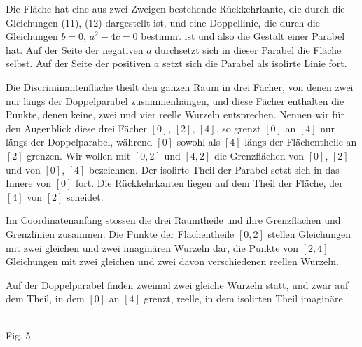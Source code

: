 \documentclass[11pt]{article}
\begin{document}
Die Fl\"ache hat eine aus zwei Zweigen bestehende R\"uckkehrkante, die durch die Gleichungen (11), (12) dargestellt ist, und eine Doppellinie, die durch die Gleichungen $b=0$, $a^2-4c=0$ bestimmt ist und also die Gestalt einer Parabel hat. Auf der Seite der negativen $a$ durchsetzt sich in dieser Parabel die Fl\"ache selbst. Auf der Seite der positiven $a$ setzt sich die Parabel als isolirte Linie fort.

Die Discriminantenfl\"ache theilt den ganzen Raum in drei F\"acher, von denen zwei nur l\"angs der Doppelparabel zusammenh\"angen, und diese F\"acher enthalten die Punkte, denen keine, zwei und vier reelle Wurzeln entsprechen. Nennen wir f\"ur den Augenblick diese drei F\"acher $[0]$, $[2]$, $[4]$, so grenzt $[0]$ an $[4]$ nur l\"angs der Doppelparabel, w\"ahrend $[0]$ sowohl als $[4]$ l\"angs der Fl\"achentheile an $[2]$ grenzen. Wir wollen mit $[0,2]$ und $[4,2]$ die Grenzfl\"achen von $[0]$, $[2]$ und von $[0]$, $[4]$ bezeichnen. Der isolirte Theil der Parabel setzt sich in das Innere von $[0]$ fort. Die R\"uckkehrkanten liegen auf dem Theil der Fl\"ache, der $[4]$ von $[2]$ scheidet.

Im Coordinatenanfang stossen die drei Raumtheile und ihre Grenzfl\"achen und Grenzlinien zusammen. Die Punkte der Fl\"achentheile $[0,2]$ stellen Gleichungen mit zwei gleichen und zwei imagin\"aren Wurzeln dar, die Punkte von $[2,4]$ Gleichungen mit zwei gleichen und zwei davon verschiedenen reellen Wurzeln.

Auf der Doppelparabel finden zweimal zwei gleiche Wurzeln statt, und zwar auf dem Theil, in dem $[0]$ an $[4]$ grenzt, reelle, in dem isolirten Theil imagin\"are.


\begin{center}
\\[0.4em]Fig. 5.
\end{center}
\end{document}
